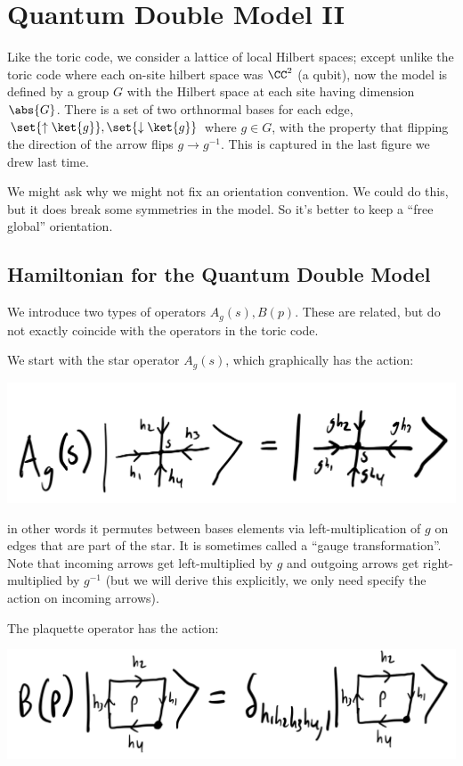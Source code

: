 \section{Quantum Double Model II}
Like the toric code, we consider a lattice of local Hilbert spaces; except unlike the toric code where each on-site hilbert space was $\CC^2$ (a qubit), now the model is defined by a group $G$ with the Hilbert space at each site having dimension $\abs{G}$. There is a set of two orthnormal bases for each edge, $\set{\uparrow\ket{g}}, \set{\downarrow\ket{g}}$ where $g \in G$, with the property that flipping the direction of the arrow flips $g \to g^{-1}$. This is captured in the last figure we drew last time.

We might ask why we might not fix an orientation convention. We could do this, but it does break some symmetries in the model. So it's better to keep a ``free global'' orientation. 

\subsection{Hamiltonian for the Quantum Double Model}
We introduce two types of operators $A_g(s), B(p)$. These are related, but do not exactly coincide with the operators in the toric code.

We start with the star operator $A_g(s)$, which graphically has the action:

\begin{center}
    \includegraphics[scale=0.35]{Lectures/Images/lec7-Agaction.png}
\end{center}

in other words it permutes between bases elements via left-multiplication of $g$ on edges that are part of the star. It is sometimes called a ``gauge transformation''. Note that incoming arrows get left-multiplied by $g$ and outgoing arrows get right-multiplied by $g^{-1}$ (but we will derive this explicitly, we only need specify the action on incoming arrows).

The plaquette operator has the action:

\begin{center}
    \includegraphics[scale=0.35]{Lectures/Images/lec7-Baction.png}
\end{center}

